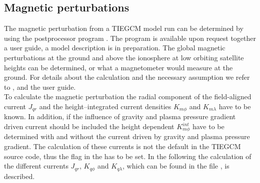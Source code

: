 %
\subsection{Magnetic perturbations}
%
The magnetic perturbation from a TIEGCM model run can be determined
by using the postprocessor program . The program is available
upon request together a  user guide, a model description
is in preparation. The global magnetic perturbations
at the ground and above the ionosphere at low orbiting satellite heights
can be determined, 
or what a magnetometer would measure at the ground. 
For details about the calculation and the
necessary assumption we refer to \cite{rich05}, \cite{rich74} and the 
 user guide. \\

%
To calculate the magnetic perturbation the radial component of the field-aligned current
$J_{qr}$ and the height--integrated current densities $K_{m \phi}$
and $K_{m \lambda}$ have to be known. In addition, if the influence of 
gravity and plasma
pressure gradient driven current
should be included the height dependent $K_{m \phi}^{int}$
have to be determined with and without the current driven by gravity and plasma
pressure gradient. The calculation of these currents
is not the default in the TIEGCM source code, thus the flag   
in the  has to be set. In the following the
calculation of the different currents $J_{qr}$, $K_{q \phi}$ and $K_{q \lambda}$, 
which can be found in the file , is described. 
%

